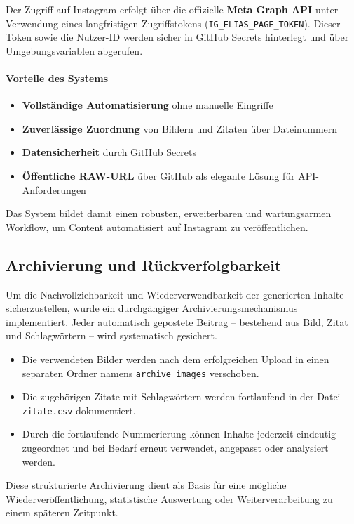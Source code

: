 \documentclass[a4paper,12pt]{article}
\begin{document}
Der Zugriff auf Instagram erfolgt über die offizielle \textbf{Meta Graph API} unter Verwendung eines langfristigen Zugriffstokens (\texttt{IG\_ELIAS\_PAGE\_TOKEN}). Dieser Token sowie die Nutzer-ID werden sicher in GitHub Secrets hinterlegt und über Umgebungsvariablen abgerufen.

\paragraph{Vorteile des Systems}

\begin{itemize}
    \item \textbf{Vollständige Automatisierung} ohne manuelle Eingriffe
    \item \textbf{Zuverlässige Zuordnung} von Bildern und Zitaten über Dateinummern
    \item \textbf{Datensicherheit} durch GitHub Secrets
    \item \textbf{Öffentliche RAW-URL} über GitHub als elegante Lösung für API-Anforderungen
\end{itemize}

Das System bildet damit einen robusten, erweiterbaren und wartungsarmen Workflow, um Content automatisiert auf Instagram zu veröffentlichen.
\subsection{Archivierung und Rückverfolgbarkeit}

Um die Nachvollziehbarkeit und Wiederverwendbarkeit der generierten Inhalte sicherzustellen, wurde ein durchgängiger Archivierungsmechanismus implementiert. Jeder automatisch gepostete Beitrag – bestehend aus Bild, Zitat und Schlagwörtern – wird systematisch gesichert.

\begin{itemize}
    \item Die verwendeten Bilder werden nach dem erfolgreichen Upload in einen separaten Ordner namens \texttt{archive\_images} verschoben.
    \item Die zugehörigen Zitate mit Schlagwörtern werden fortlaufend in der Datei \texttt{zitate.csv} dokumentiert.
    \item Durch die fortlaufende Nummerierung können Inhalte jederzeit eindeutig zugeordnet und bei Bedarf erneut verwendet, angepasst oder analysiert werden.
\end{itemize}

Diese strukturierte Archivierung dient als Basis für eine mögliche Wiederveröffentlichung, statistische Auswertung oder Weiterverarbeitung zu einem späteren Zeitpunkt.
\end{document}

